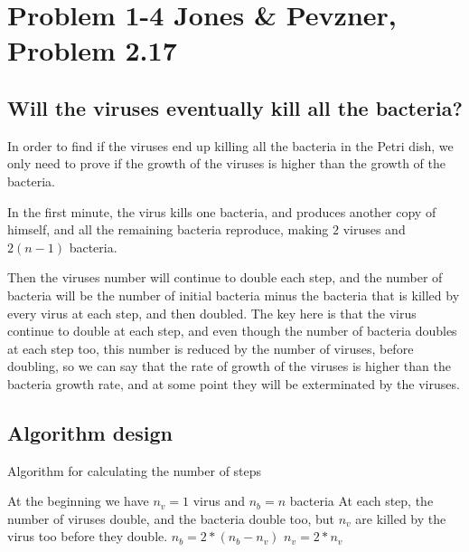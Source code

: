\documentclass{article}
\begin{document}
\section*{Problem 1-4 Jones \& Pevzner, Problem 2.17}

\subsection*{Will the viruses eventually kill all the bacteria?}
In order to find if the viruses end up killing all the bacteria in the Petri dish, we only need to prove if the growth of the viruses is higher than the growth of the bacteria.

In the first minute, the virus kills one bacteria, and produces another copy of himself, and all the remaining bacteria reproduce, making $2$ viruses and $2(n-1)$ bacteria.

Then the viruses number will continue to double each step, and the number of bacteria will be the number of initial bacteria minus the bacteria that is killed by every virus at each step, and then doubled. The key here is that the virus continue to double at each step, and even though the number of bacteria doubles at each step too, this number is reduced by the number of viruses, before doubling, so we can say that the rate of growth of the viruses is higher than the bacteria growth rate, and at some point they will be exterminated by the viruses.

\subsection*{Algorithm design}

\begin{algorithm}[H]
\caption{Algorithm for calculating the number of steps}
\begin{algorithmic}[1]
\State At the beginning we have $n_v = 1$ virus and $n_b = n$ bacteria
\State At each step, the number of viruses double, and the bacteria double too, but $n_v$ are killed by the virus too before they double.
 \State $n_b = 2*(n_b-n_v)$
 \State $n_v = 2*n_v$
\EndWhile
\end{algorithmic}
\end{algorithm}
\end{document}
